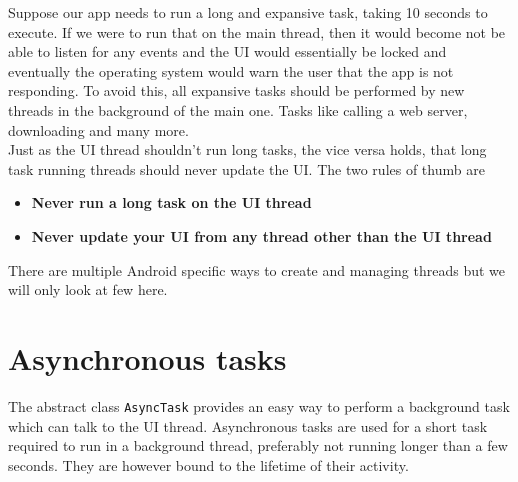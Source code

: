 Suppose our app needs to run a long and expansive task, taking 10 seconds to execute. If we were to run that on the main thread, then it would become not be able to listen for any events and the UI would essentially be locked and eventually the operating system would warn the user that the app is not responding. To avoid this, all expansive tasks should be performed by new threads in the background of the main one. Tasks like calling a web server, downloading and many more.\\

Just as the UI thread shouldn't run long tasks, the vice versa holds, that long task running threads should never update the UI. The two rules of thumb are
\begin{itemize}
\item \textbf{Never run a long task on the UI thread}
\item \textbf{Never update your UI from any thread other than the UI thread}
\end{itemize}

There are multiple Android specific ways to create and managing threads but we will only look at few here.

\section{Asynchronous tasks}
The abstract class \texttt{AsyncTask} provides an easy way to perform a background task which can talk to the UI thread. Asynchronous tasks are used for a short task required to run in a background thread, preferably not running longer than a few seconds. They are however bound to the lifetime of their activity.\\


